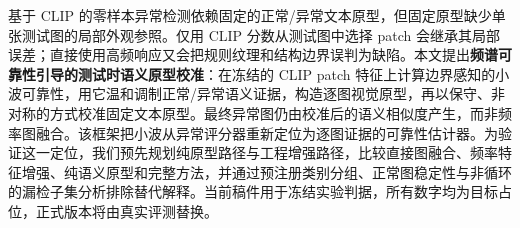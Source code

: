 基于 CLIP 的零样本异常检测依赖固定的正常/异常文本原型，但固定原型缺少单张测试图的局部外观参照。仅用 CLIP 分数从测试图中选择 patch 会继承其局部误差；直接使用高频响应又会把规则纹理和结构边界误判为缺陷。本文提出\textbf{频谱可靠性引导的测试时语义原型校准}：在冻结的 CLIP patch 特征上计算边界感知的小波可靠性，用它温和调制正常/异常语义证据，构造逐图视觉原型，再以保守、非对称的方式校准固定文本原型。最终异常图仍由校准后的语义相似度产生，而非频率图融合。该框架把小波从异常评分器重新定位为逐图证据的可靠性估计器。为验证这一定位，我们预先规划纯原型路径与工程增强路径，比较直接图融合、频率特征增强、纯语义原型和完整方法，并通过预注册类别分组、正常图稳定性与非循环的漏检子集分析排除替代解释。当前稿件用于冻结实验判据，所有数字均为目标占位，正式版本将由真实评测替换。
